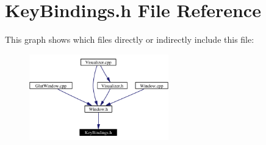 \section{Key\-Bindings.h File Reference}
\label{KeyBindings_8h}


This graph shows which files directly or indirectly include this file:\begin{figure}[H]
\begin{center}
\leavevmode
\includegraphics[width=171pt]{KeyBindings_8h__dep__incl}
\end{center}
\end{figure}
